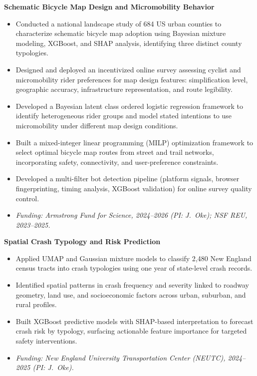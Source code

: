 \documentclass[10pt, a4paper]{article}
\begin{document}
\vspace{4pt}
\textbf{Schematic Bicycle Map Design and Micromobility Behavior}
\begin{itemize}
  \item Conducted a national landscape study of 684 US urban counties to characterize schematic bicycle map adoption using Bayesian mixture modeling, XGBoost, and SHAP analysis, identifying three distinct county typologies.
  \item Designed and deployed an incentivized online survey assessing cyclist and micromobility rider preferences for map design features: simplification level, geographic accuracy, infrastructure representation, and route legibility.
  \item Developed a Bayesian latent class ordered logistic regression framework to identify heterogeneous rider groups and model stated intentions to use micromobility under different map design conditions.
  \item Built a mixed-integer linear programming (MILP) optimization framework to select optimal bicycle map routes from street and trail networks, incorporating safety, connectivity, and user-preference constraints.
  \item Developed a multi-filter bot detection pipeline (platform signals, browser fingerprinting, timing analysis, XGBoost validation) for online survey quality control.
  \item \textit{Funding: Armstrong Fund for Science, 2024--2026 (PI: J.~Oke); NSF REU, 2023--2025.}
\end{itemize}

\vspace{4pt}
\textbf{Spatial Crash Typology and Risk Prediction}
\begin{itemize}
  \item Applied UMAP and Gaussian mixture models to classify 2,480 New England census tracts into crash typologies using one year of state-level crash records.
  \item Identified spatial patterns in crash frequency and severity linked to roadway geometry, land use, and socioeconomic factors across urban, suburban, and rural profiles.
  \item Built XGBoost predictive models with SHAP-based interpretation to forecast crash risk by typology, surfacing actionable feature importance for targeted safety interventions.
  \item \textit{Funding: New England University Transportation Center (NEUTC), 2024--2025 (PI: J.~Oke).}
\end{itemize}
\end{document}
